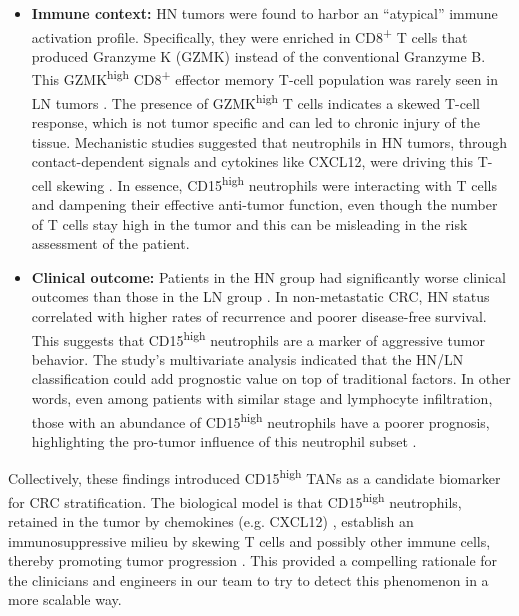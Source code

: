 \begin{itemize}
    \item \textbf{Immune context:} HN tumors were found to harbor an ``atypical'' immune activation profile. Specifically, they were enriched in CD8\textsuperscript{+} T cells that produced Granzyme K (GZMK) instead of the conventional Granzyme B. This GZMK\textsuperscript{high} CD8\textsuperscript{+} effector memory T-cell population was rarely seen in LN tumors \cite{manzo2022}. The presence of GZMK\textsuperscript{high} T cells indicates a skewed T-cell response, which is not tumor specific and can led to chronic injury of the tissue. Mechanistic studies suggested that neutrophils in HN tumors, through contact-dependent signals and cytokines like CXCL12, were driving this T-cell skewing \cite{manzo2022}. In essence, CD15\textsuperscript{high} neutrophils were interacting with T cells and dampening their effective anti-tumor function, even though the number of T cells stay high in the tumor and this can be misleading in the risk assessment of the patient.
    
    \item \textbf{Clinical outcome:} Patients in the HN group had significantly worse clinical outcomes than those in the LN group \cite{manzo2022}. In non-metastatic CRC, HN status correlated with higher rates of recurrence and poorer disease-free survival. This suggests that CD15\textsuperscript{high} neutrophils are a marker of aggressive tumor behavior. The study's multivariate analysis indicated that the HN/LN classification could add prognostic value on top of traditional factors. In other words, even among patients with similar stage and lymphocyte infiltration, those with an abundance of CD15\textsuperscript{high} neutrophils have a poorer prognosis, highlighting the pro-tumor influence of this neutrophil subset \cite{manzo2022}.
\end{itemize}

Collectively, these findings introduced CD15\textsuperscript{high} TANs as a candidate biomarker for CRC stratification. The biological model is that CD15\textsuperscript{high} neutrophils, retained in the tumor by chemokines (e.g. CXCL12) \cite{manzo2022}, establish an immunosuppressive milieu by skewing T cells and possibly other immune cells, thereby promoting tumor progression \cite{manzo2022}. This provided a compelling rationale for the clinicians and engineers in our team to try to detect this phenomenon in a more scalable way.

